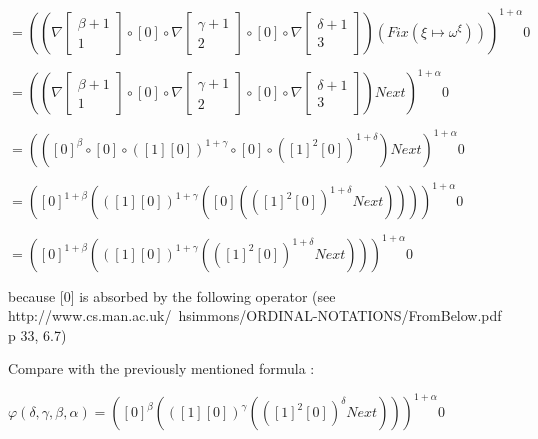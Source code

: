 \documentclass[10pt]{article}
\begin{document}
\( = ((\nabla \begin{bmatrix} \beta+1 \\
                              1       \end{bmatrix} \circ [0] \circ \nabla \begin{bmatrix} \gamma+1 \\
                                                                                           2        \end{bmatrix} \circ [0] \circ \nabla \begin{bmatrix} \delta+1 \\
                                                                                                                                                         3        \end{bmatrix}) (Fix (\xi \mapsto \omega^\xi)))^{1+\alpha} 0 \)

\( = ((\nabla \begin{bmatrix} \beta+1 \\
                              1       \end{bmatrix} \circ [0] \circ \nabla \begin{bmatrix} \gamma+1 \\
                                                                                           2        \end{bmatrix} \circ [0] \circ \nabla \begin{bmatrix} \delta+1 \\
                                                                                                                                                         3        \end{bmatrix}) Next)^{1+\alpha} 0 \)

\( = (([0]^\beta \circ [0] \circ ([1] [0])^{1+\gamma} \circ [0] \circ ([1]^2 [0])^{1+\delta}) Next)^{1+\alpha} 0 \)

\( = ([0]^{1+\beta} (([1] [0])^{1+\gamma} ([0] (([1]^2 [0])^{1+\delta} Next))))^{1+\alpha} 0 \)

\( = ([0]^{1+\beta} (([1] [0])^{1+\gamma} (([1]^2 [0])^{1+\delta} Next)))^{1+\alpha} 0 \) 

because [0] is absorbed by the following operator (see http://www.cs.man.ac.uk/~hsimmons/ORDINAL-NOTATIONS/FromBelow.pdf p 33, 6.7)

Compare with the previously mentioned formula :

\( \varphi(\delta,\gamma,\beta,\alpha) = ([0]^\beta (([1] [0])^\gamma (([1]^2 [0])^\delta Next)))^{1+\alpha} 0 \)
\end{document}
